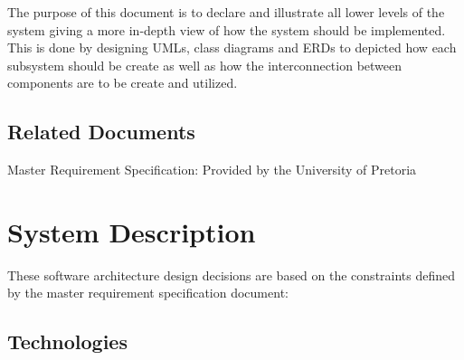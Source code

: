 \documentclass[12pt]{article}
\begin{document}
		\vspace{0.5cm}
		
		The purpose of this document is to declare and illustrate all lower levels of the system giving a more in-depth view of how the system should be implemented. This is done by designing UMLs, class diagrams and ERDs to depicted how each subsystem should be create as well as how the interconnection between components are to be create and utilized.

		\vspace{0.5cm}
		
	\subsection{Related Documents}

		\vspace{0.5cm}
		
		Master Requirement Specification: Provided by the University of Pretoria
		
		\vspace{0.5cm}

\section{System Description}

		\vspace{0.5cm}
		
These software architecture design decisions are based on the constraints defined by the master requirement specification document:

		\vspace{0.5cm}
		
	\subsection{Technologies}
	
		\vspace{0.5cm}
	
\end{document}
